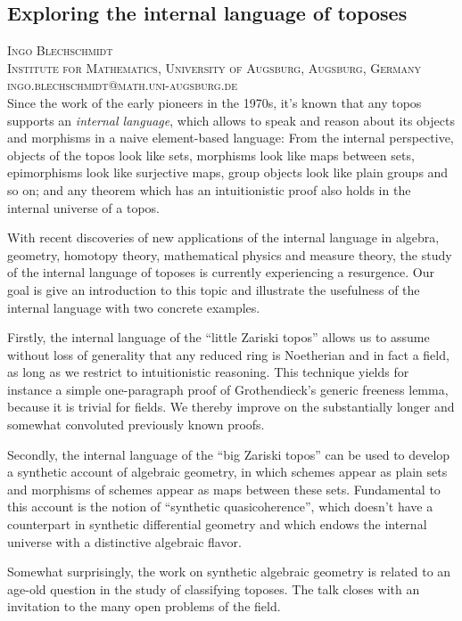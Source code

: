 \documentclass{article}
\begin{document}
\subsection*{Exploring the internal language of toposes}

\noindent
{\scshape Ingo Blechschmidt}\\
{\scshape Institute for Mathematics,
University of Augsburg, Augsburg, Germany}\\
{\scshape ingo.blechschmidt@math.uni-augsburg.de}\\

Since the work of the early pioneers in the 1970s, it's known that any topos
supports an \emph{internal language}, which allows to speak and reason about
its objects and morphisms in a naive element-based language: From the internal
perspective, objects of the topos look like sets, morphisms look like maps
between sets, epimorphisms look like surjective maps, group objects look like
plain groups and so on; and any theorem which has an intuitionistic proof also
holds in the internal universe of a topos.

With recent discoveries of new applications of the internal language in
algebra, geometry, homotopy theory, mathematical physics and measure theory,
the study of the internal language of toposes is currently experiencing a
resurgence. Our goal is give an introduction to this topic and illustrate the
usefulness of the internal language with two concrete examples.

Firstly, the internal language of the ``little Zariski topos'' allows us to
assume without loss of generality that any reduced ring is Noetherian and in
fact a field, as long as we restrict to intuitionistic reasoning. This
technique yields for instance a simple one-paragraph proof of
Grothendieck's generic freeness lemma, because it is trivial for fields. We
thereby improve on the substantially longer and somewhat convoluted previously known proofs.

Secondly, the internal language of the ``big Zariski topos'' can be used to
develop a synthetic account of algebraic geometry, in which schemes appear as
plain sets and morphisms of schemes appear as maps between these sets.
Fundamental to this account is the notion of ``synthetic quasicoherence'',
which doesn't have a counterpart in synthetic differential geometry and which
endows the internal universe with a distinctive algebraic flavor.

Somewhat surprisingly, the work on synthetic algebraic geometry is related to
an age-old question in the study of classifying toposes. The talk closes with
an invitation to the many open problems of the field.
\end{document}
